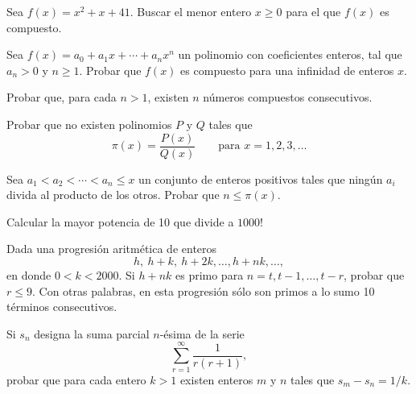 \documentclass[12pt,a4paper]{book}
\begin{document}
    \begin{ejercicio}
        Sea $f(x)=x^2+x+41$. Buscar el menor entero $x\geq0$ para el que $f(x)$ es
        compuesto.
    \end{ejercicio}

    \begin{ejercicio}
        Sea $f(x)=a_0+a_1x+\cdots+a_nx^n$ un polinomio con coeficientes enteros, tal
        que $a_n>0$ y $n\geq1$. Probar que $f(x)$ es compuesto para una infinidad de
        enteros $x$.
    \end{ejercicio}

    \begin{ejercicio}
        Probar que, para cada $n>1$, existen $n$ números compuestos consecutivos.
    \end{ejercicio}

    \begin{ejercicio}
        Probar que no existen polinomios $P$ y $Q$ tales que
        \begin{equation*}
            \pi(x)=\frac{P(x)}{Q(x)}\qquad\text{para } x=1,2,3,\dots
        \end{equation*}
    \end{ejercicio}

    \begin{ejercicio}
        Sea $a_1<a_2<\cdots<a_n\leq x$ un conjunto de enteros positivos tales que
        ningún $a_i$ divida al producto de los otros. Probar que $n\leq\pi(x)$.
    \end{ejercicio}

    \begin{ejercicio}
        Calcular la mayor potencia de 10 que divide a $1000!$
    \end{ejercicio}

    \begin{ejercicio}
        Dada una progresión aritmética de enteros
        \begin{equation*}
            h,\ h+k,\ h+2k,\dots,h+nk,\dots,
        \end{equation*}
        en donde $0<k<2000$. Si $h+nk$ es primo para $n=t,t-1,\dots,t-r$, probar que
        $r\leq9$. Con otras palabras, en esta progresión sólo son primos a lo sumo 10
        términos consecutivos.
    \end{ejercicio}

    \begin{ejercicio}
        Si $s_n$ designa la suma parcial $n$-ésima de la serie
        \begin{equation*}
            \sum_{r=1}^{\infty}\frac{1}{r(r+1)},
        \end{equation*}
        probar que para cada entero $k>1$ existen enteros $m$ y $n$ tales que
        $s_m-s_n=1/k$.
    \end{ejercicio}
\end{document}
